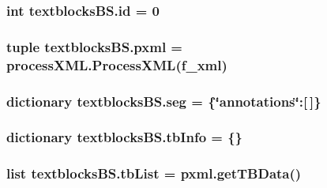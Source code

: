 \subsubsection[{id}]{\setlength{\rightskip}{0pt plus 5cm}int textblocks\+B\+S.\+id = 0}\label{namespacetextblocks_b_s_a48505fdd626c2db822b34807b7369490}
\hypertarget{namespacetextblocks_b_s_ac3d5f32f9bba2376d6fb4def7fcd2a7c}{}
\subsubsection[{pxml}]{\setlength{\rightskip}{0pt plus 5cm}tuple textblocks\+B\+S.\+pxml = {\bf process\+X\+M\+L.\+Process\+X\+M\+L}({\bf f\+\_\+xml})}\label{namespacetextblocks_b_s_ac3d5f32f9bba2376d6fb4def7fcd2a7c}
\hypertarget{namespacetextblocks_b_s_ab8e8106d797a26f0347a5f3e8968588c}{}
\subsubsection[{seg}]{\setlength{\rightskip}{0pt plus 5cm}dictionary textblocks\+B\+S.\+seg = \{\char`\"{}annotations\char`\"{}\+:\mbox{[}$\,$\mbox{]}\}}\label{namespacetextblocks_b_s_ab8e8106d797a26f0347a5f3e8968588c}
\hypertarget{namespacetextblocks_b_s_a5be6e90dda43df099e0944d4f14df97e}{}
\subsubsection[{tb\+Info}]{\setlength{\rightskip}{0pt plus 5cm}dictionary textblocks\+B\+S.\+tb\+Info = \{\}}\label{namespacetextblocks_b_s_a5be6e90dda43df099e0944d4f14df97e}
\hypertarget{namespacetextblocks_b_s_a0853163bb6caefb45dce81554085dc68}{}
\subsubsection[{tb\+List}]{\setlength{\rightskip}{0pt plus 5cm}list textblocks\+B\+S.\+tb\+List = pxml.\+get\+T\+B\+Data()}\label{namespacetextblocks_b_s_a0853163bb6caefb45dce81554085dc68}
